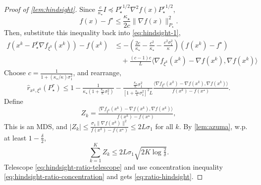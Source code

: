 \documentclass{article}
\theoremstyle{definition}
\begin{document}
\begin{proof}[Proof of \cref{lem:hindsight}]
  Since $\frac{c}{\kappa_{\star}} {I \preceq P^r_{\star}}^{1 / 2} \nabla^2 f
  (x) {P^r_{\star}}^{1 / 2}$,
  \[ f (x) - f^{\star} \leq \frac{\kappa_{\star}}{2 c} \| \nabla f (x)
     \|_{P_{\star}}^2 . \]
  Then, substitute this inequality back into \eqref{eq:hindsight-1},
  \begin{align*}
    f (x^k - P^r_{\star} \nabla f_{\xi^k} (x^k)) - f (x^k) &{}\leq - \left(
    \tfrac{2 c}{\kappa_{\star}} - \tfrac{c^2}{\kappa_{\star}} - \tfrac{c^2
    \sigma_1^2}{\kappa} \right) (f (x^k) - f^{\star})\\
    &{}\quad + \tfrac{(c - 1) c}{L} \langle \nabla f_{\xi^k} (x^k) - \nabla f
    (x^k), \nabla f (x^k) \rangle
  \end{align*}
  Choose $c = \frac{1}{1 + (\kappa_{\star} / \kappa) \sigma_1^2}$, and
  rearrange,
  \begin{equation}
    \hat{r}_{x^k, \xi^k} (P^r_{\star}) \leq 1 - \tfrac{1}{\kappa_{\star}
    \left( 1 + \frac{\kappa_{\star}}{\kappa} \sigma_1^2 \right)} -
    \tfrac{\frac{\kappa_{\star}}{\kappa} \sigma_1^2}{\left[ 1 +
    \frac{\kappa_{\star}}{\kappa} \sigma_1^2 \right]^2 L} \tfrac{\langle
    \nabla f_{\xi^k} (x^k) - \nabla f (x^k), \nabla f (x^k) \rangle}{f (x^k) -
    f (x^{\star})} . \label{eq:hindsight-ratio-telescope}
  \end{equation}
  Define
  \[ Z_k = \tfrac{\langle \nabla f_{\xi^k} (x^k) - \nabla f (x^k), \nabla f
     (x^k) \rangle}{f (x^k) - f (x^{\star})}, \]
  This is an MDS, and $| Z_k | \leq \tfrac{\sigma_1 \| \nabla f (x^k) \|^2}{f
  (x^k) - f (x^{\star})} \leq 2 L \sigma_1$ for all $k$. By
  \cref{lem:azuma}, w.p. at least $1 - \frac{\delta}{2}$,
  \begin{equation}
    \textstyle \sum_{k = 1}^K Z_k \leq 2 L \sigma_1 \sqrt{2 K \log \tfrac{2}{\delta}} .
    \label{eq:hindsight-ratio-concentration}
  \end{equation}
  Telescope \eqref{eq:hindsight-ratio-telescope} and use concentration
  inequality \eqref{eq:hindsight-ratio-concentration} and gets
  \eqref{eq:ratio-hindsight}.
  

\end{proof}
\end{document}
